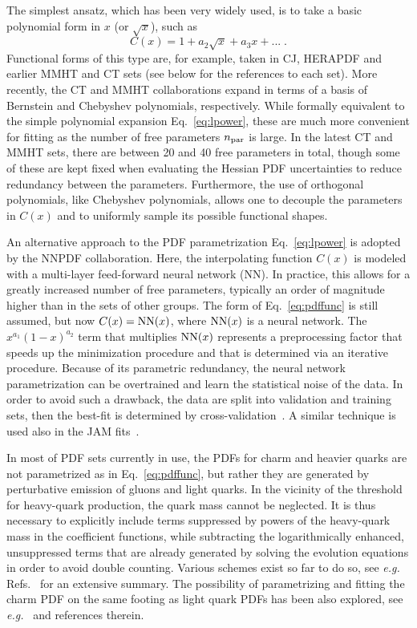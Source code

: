 The simplest ansatz, which has been very widely used, is to take a basic 
polynomial form in $x$ (or $\sqrt{x}$), such as
\begin{equation}\label{eq:lpower}
C(x)=1+a_2\sqrt{x}+a_3 x+...\;.
\end{equation}
Functional forms of this type are, for example, taken in CJ, HERAPDF and 
earlier MMHT and CT sets (see below for the references to each set). 
%
More recently, the CT and MMHT collaborations expand 
in terms of a basis of  Bernstein and Chebyshev polynomials, respectively.
%
While formally equivalent to the simple polynomial expansion
Eq.~\eqref{eq:lpower}, these are much more convenient for fitting as the 
number of free parameters $n_{\rm par}$ is large.
%
In the latest CT and MMHT sets, there are between 20 and 40 free parameters in 
total, though some of these are kept fixed when evaluating the
Hessian PDF uncertainties to reduce redundancy between the parameters.
%
Furthermore, the use of orthogonal polynomials, like Chebyshev 
polynomials, allows one to decouple the parameters in $C(x)$ and to uniformly
sample its possible functional shapes.

An alternative approach to the PDF parametrization Eq.~\eqref{eq:lpower}
is adopted by the NNPDF collaboration. 
%
Here, the interpolating function $C(x)$ is modeled with 
a multi-layer feed-forward neural network (NN).
%
In practice, this allows for a greatly increased number of free parameters, 
typically an order of magnitude higher than in the sets of other groups.
%
The form of Eq.~\eqref{eq:pdffunc} is still assumed, but
now $C(x)={\rm NN}(x)$, where ${\rm NN}(x)$ is a neural network.
%
The $x^{a_1}(1-x)^{a_2}$ term that multiplies ${\rm NN}(x)$ represents
a preprocessing factor that speeds up the minimization procedure
and that is determined via an iterative procedure.
%
Because of its parametric redundancy, the neural network parametrization
can be overtrained and learn the statistical noise of the data.
%
In order to avoid such a drawback, the data are split into validation and 
training sets, then the best-fit is determined by
cross-validation~\cite{Forte:2002fg,DelDebbio:2004xtd}.
%
A similar technique is used also in the JAM 
fits~\cite{Sato:2016tuz,Ethier:2017zbq}.

In most of PDF sets currently in use, the PDFs for charm and heavier quarks
are not parametrized as in Eq.~\eqref{eq:pdffunc}, but rather they are
generated by perturbative emission of gluons and light quarks.
%
In the vicinity of the threshold for heavy-quark production, the quark mass
cannot be neglected.
%
It is thus necessary to explicitly include terms suppressed by
powers of the heavy-quark mass in the coefficient functions, while 
subtracting the logarithmically enhanced, unsuppressed terms that are 
already generated by solving the evolution equations in order 
to avoid double counting.
%
Various schemes exist so far to do so, see {\it e.g.}
Refs.~\cite{Forte:2013wc,Gao:2017yyd} for an extensive summary.
%
The possibility of parametrizing and fitting the charm PDF
on the same footing as light quark PDFs has been also explored, see 
{\it e.g.}~\cite{Brodsky:2015fna,Ball:2016neh,Hou:2017khm}
and references therein.

